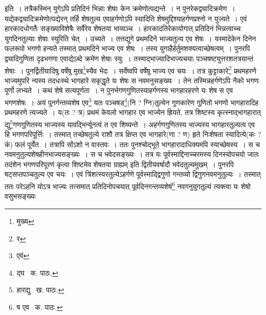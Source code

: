 \documentclass[11pt, openany]{book}
\begin{document}
\noindent इति~। तत्रैकस्मिन् युगेऽपि प्रतिदिनं भिन्नाः शेषाः केन क्रमेणोत्पद्यन्ते~। न पुनरेकद्व्यादिक्रमेण~। यद्येकद्व्यादिक्रमेणोत्पद्येरन् तर्हि शेषतुल्य एवाहर्गणोऽपि स्यादिति शेषमुद्दिश्याहर्गणप्रश्नो न युज्यते~। एवं हारकादधोगतैः सङ्ख्याविशेषैः सर्वैरेव शेषतया भाव्यञ्च~। हारकादतिरेकायोगात् प्रतिदिनं भिन्नत्वाच्च युगदिनतुल्याः शेषाः स्युरिति चेत्~। उच्यते~। तत्तद्युगे प्रथमदिने भाज्यतुल्य एव शेषः~। यस्मादेकेन दिनेन फलरूपो भगणो हन्यते तस्मात् प्रथमदिने भाज्य एव शेषः~। तस्य युगाहैर्हर्तुमशक्यत्वाच्छेषत्वम्~। पुनरपि द्व्यादिगुणिता दृढभगणा एवाद्येऽब्दे क्रमेण शेषाः स्युः~। तस्माद्भाज्यादिभाज्यचयाः पञ्चषष्ट्युत्तरशतत्रयान्तं शेषाः~। पुनर्द्वितीयादिषु वर्षेषु मुख\renewcommand{\thefootnote}{१}\footnote{मुख्य}स्यैव भेदः~। सर्वेष्वपि वर्षेषु भाज्य एव चयः~। तत्र कुट्टाकारे\renewcommand{\thefootnote}{२}\footnote{र} प्रथमहरणे भाज्यमुपरि न्यस्य तदधःस्थे भागहारे सकृद्धृते यः शेषः स नवमनुसङ्ख्यः~। तेन तस्मिन्नहर्गणेऽपि नैको भगणः पूर्णो लभ्यते~। कथं शेषे सत्यपूर्णता~। न पुनर्भगणगुणितस्याहर्गणस्य भागहारहरणे यः शेष स एव भगणशेषः~। अयं पुनर्गन्तव्यशेष एव\renewcommand{\thefootnote}{३}\footnote{एवं} यतः पञ्चषड\renewcommand{\thefootnote}{४}\footnote{द्घ \textendash\ क. पाठः.}(नि ? ग्नि)तुल्येन गुणकारेण गुणितो भगणो भागहारादिह प्रथमहरणे त्यज्यते~। य(तः ? त्र) प्रथमं केवलो भागहार एव भाज्येन ह्रियते, तत्र शिष्टस्य कृत्स्नाद्भागहारात् द्यु\renewcommand{\thefootnote}{५}\footnote{हारद्यु \textendash\ ख. पाठः.}गणगुणितस्य भाज्यस्य यावद्भिर्न्यूनत्वं त एव शिष्यन्ते~। अहर्गणगुणितस्य भाज्यस्य भागहारतुल्यत्व एव हि भगणपरिपूर्त्तिः~। तस्मात् तच्छेषतुल्ये राशौ तत्र क्षिप्त एव भागहारे(णा ? ण) हृते निःशेषता स्यादित्ये(कः ? कं) फलं पूर्येत~। तत्रापि सोंऽशो न वास्तवः~। ततः पुनश्चोद्भूते भागहारादाधिक्यमपि स्याच्छेषस्य~। स च नवमनुतुल्यशेषहीनभाज्यसङ्ख्यः~। स च भवेदसङ्ख्यः~। तत्र यः पूर्वस्माद्दिनाच्चरमस्य दिनस्योपचयो जातः तदंशेन भगणपरिपूरणं कृत्वा शिष्टमेव शेषतया ग्राह्यम् इति द्वितीयवर्षादौ भवेदतुल्यमुखम्~। पुनरपि षट्सप्तपञ्चतुल्य एव चयः~। एवं त्रिंशत्स्वरतुल्येऽहर्गणे पूर्वस्माद्द्विगुणो गन्तव्यो द्विगुणनवमनुतुल्यः~। तस्मात् ततः परेऽहनि योऽत्र भाज्यः तत्समात् प्रतिदिनोपचयात् पूर्वदिनगन्तव्यशेषं\renewcommand{\thefootnote}{६}\footnote{ष एव \textendash\ क. पाठः.} नवगनुयुगतुल्यं त्यक्त्वा यः शेषो वसुभसङ्ख्यः

\newpage
\end{document}
